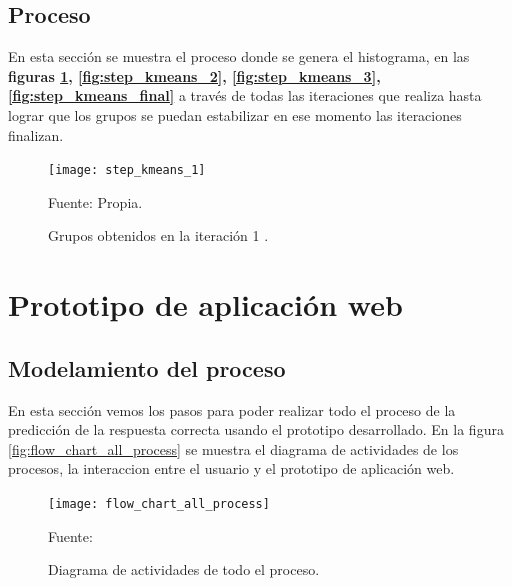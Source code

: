 \subsection{Proceso}

En esta sección se muestra el proceso donde se genera el histograma, en las \textbf{figuras \ref{fig:step_kmeans_1}, \ref{fig:step_kmeans_2}, \ref{fig:step_kmeans_3},\ref{fig:step_kmeans_final}} a través de todas las iteraciones que realiza hasta lograr que los grupos se puedan estabilizar en ese momento las iteraciones finalizan.

\begin{figure}[H]
	\begin{center}
		\texttt{[image: step\_kmeans\_1]}
	\end{center}
	\begin{center}
		\vskip -0.5cm
		\caption{\label{fig:step_kmeans_1}\small{Grupos obtenidos en la iteración 1 .}}
		{\small{Fuente: Propia. }}
	\end{center}
\end{figure}






















\section{Prototipo de aplicación web} 

\subsection{Modelamiento del proceso}

En esta sección vemos los pasos para poder realizar todo el proceso de la predicción de la respuesta correcta usando el prototipo desarrollado. En la figura \ref{fig:flow_chart_all_process} se muestra el diagrama de actividades de los procesos, la interaccion entre el usuario y el prototipo de aplicación web.

\begin{figure}[ht]
	\begin{center}
		\texttt{[image: flow\_chart\_all\_process]}
	\end{center}
	\begin{center}
		\vskip -0.5cm
		\caption{\small{Diagrama de actividades de todo el proceso.}}
		{\small{Fuente: }}
	\end{center}
\end{figure}


